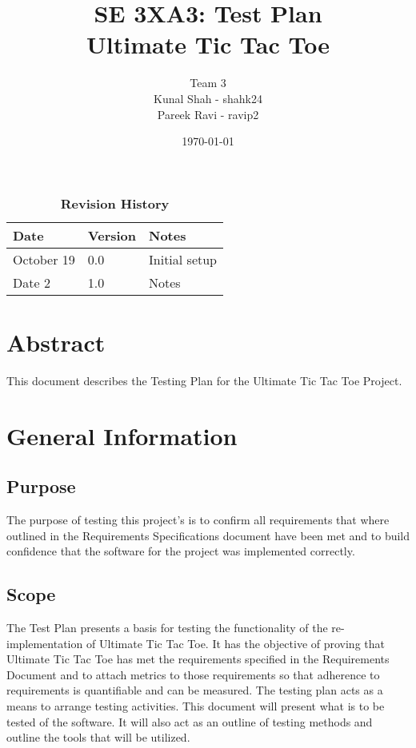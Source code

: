 \documentclass[12pt, titlepage]{article}
\title{SE 3XA3: Test Plan\\Ultimate Tic Tac Toe}
\author{Team 3
		\\ Kunal Shah - shahk24
		\\ Pareek Ravi - ravip2
}
\date{\today}
\begin{document}
\maketitle

\tableofcontents
\listoftables
\listoffigures

\begin{table}[bp]
\caption{\bf Revision History}
\begin{tabularx}{\textwidth}{p{3cm}p{2cm}X}
\toprule {\bf Date} & {\bf Version} & {\bf Notes}\\
\midrule
October 19 & 0.0 & Initial setup\\
Date 2 & 1.0 & Notes\\
\bottomrule
\end{tabularx}
\end{table}

\newpage


\section*{Abstract} 
This document describes the Testing Plan for the Ultimate Tic Tac Toe Project.

\section{General Information}

\subsection{Purpose}
The purpose of testing this project's is to confirm all requirements that where
outlined in the Requirements Specifications document have been met and to build
confidence that the software for the project was implemented correctly.

\subsection{Scope}
The Test Plan presents a basis for testing the functionality of the re-
implementation of Ultimate Tic Tac Toe. It has the objective of proving that
Ultimate Tic Tac Toe has met the requirements specified in the Requirements
Document and to attach metrics to those requirements so that adherence to
requirements is quantifiable and can be measured. The testing plan acts as a
means to arrange testing activities. This document will present what is to be
tested of the software. It will also act as an outline of testing methods and
outline the tools that will be utilized.
\end{document}
